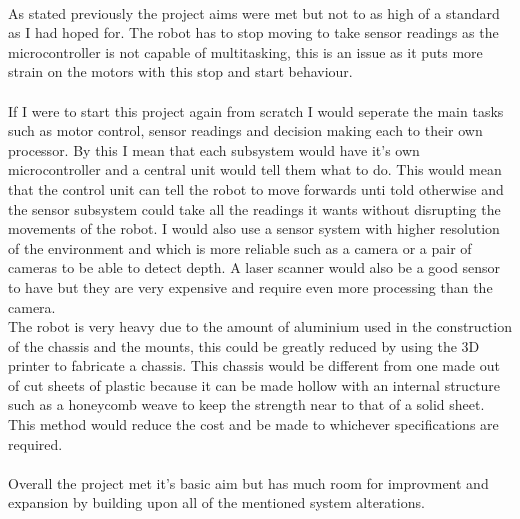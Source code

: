 \\As stated previously the project aims were met but not to as high of a standard as I had hoped for.  The robot has to stop moving to take sensor readings as the microcontroller is not capable of multitasking, this is an issue as it puts more strain on the motors with this stop and start behaviour.
\\\\If I were to start this project again from scratch I would seperate the main tasks such as motor control, sensor readings and decision making each to their own processor.  By this I mean that each subsystem would have it's own microcontroller and a central unit would tell them what to do.  This would mean that the control unit can tell the robot to move forwards unti told otherwise and the sensor subsystem could take all the readings it wants without disrupting the movements of the robot.  I would also use a sensor system with higher resolution of the environment and which is more reliable such as a camera or a pair of cameras to be able to detect depth.  A laser scanner would also be a good sensor to have but they are very expensive and require even more processing than the camera.
\\The robot is very heavy due to the amount of aluminium used in the construction of the chassis and the mounts, this could be greatly reduced by using the 3D printer to fabricate a chassis.  This chassis would be different from one made out of cut sheets of plastic because it can be made hollow with an internal structure such as a honeycomb weave to keep the strength near to that of a solid sheet.  This method would reduce the cost and be made to whichever specifications are required.
\\\\Overall the project met it's basic aim but has much room for improvment and expansion by building upon all of the mentioned system alterations.